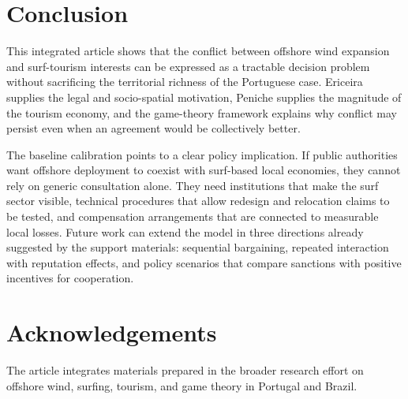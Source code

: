 \documentclass[final,times,authoryear]{elsarticle}
\begin{document}
\section{Conclusion}
\label{sec_conclusion}

This integrated article shows that the conflict between offshore wind expansion and surf-tourism interests can be expressed as a tractable decision problem without sacrificing the territorial richness of the Portuguese case. Ericeira supplies the legal and socio-spatial motivation, Peniche supplies the magnitude of the tourism economy, and the game-theory framework explains why conflict may persist even when an agreement would be collectively better.

The baseline calibration points to a clear policy implication. If public authorities want offshore deployment to coexist with surf-based local economies, they cannot rely on generic consultation alone. They need institutions that make the surf sector visible, technical procedures that allow redesign and relocation claims to be tested, and compensation arrangements that are connected to measurable local losses. Future work can extend the model in three directions already suggested by the support materials: sequential bargaining, repeated interaction with reputation effects, and policy scenarios that compare sanctions with positive incentives for cooperation.

\section*{Acknowledgements}

The article integrates materials prepared in the broader research effort on offshore wind, surfing, tourism, and game theory in Portugal and Brazil.



\end{document}
